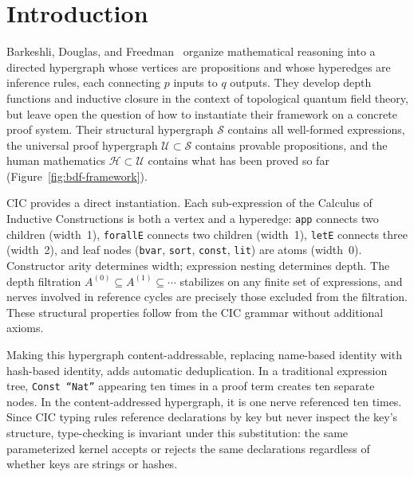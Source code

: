 \section{Introduction}\label{sec:introduction}

Barkeshli, Douglas, and Freedman~\cite{BDF2026} organize mathematical reasoning into a directed hypergraph whose vertices are propositions and whose hyperedges are inference rules, each connecting $p$ inputs to $q$ outputs.  They develop depth functions and inductive closure in the context of topological quantum field theory, but leave open the question of how to instantiate their framework on a concrete proof system.  Their structural hypergraph $\mathcal{S}$ contains all well-formed expressions, the universal proof hypergraph $\mathcal{U} \subset \mathcal{S}$ contains provable propositions, and the human mathematics $\mathcal{H} \subset \mathcal{U}$ contains what has been proved so far (Figure~\ref{fig:bdf-framework}).

CIC provides a direct instantiation.  Each sub-expression of the Calculus of Inductive Constructions is both a vertex and a hyperedge: \texttt{app} connects two children (width~1), \texttt{forallE} connects two children (width~1), \texttt{letE} connects three (width~2), and leaf nodes (\texttt{bvar}, \texttt{sort}, \texttt{const}, \texttt{lit}) are atoms (width~0).  Constructor arity determines width; expression nesting determines depth.  The depth filtration $A^{(0)} \subseteq A^{(1)} \subseteq \cdots$ stabilizes on any finite set of expressions, and nerves involved in reference cycles are precisely those excluded from the filtration.  These structural properties follow from the CIC grammar without additional axioms.

Making this hypergraph content-addressable, replacing name-based identity with hash-based identity, adds automatic deduplication.  In a traditional expression tree, \texttt{Const ``Nat''} appearing ten times in a proof term creates ten separate nodes.  In the content-addressed hypergraph, it is one nerve referenced ten times.  Since CIC typing rules reference declarations by key but never inspect the key's structure, type-checking is invariant under this substitution: the same parameterized kernel accepts or rejects the same declarations regardless of whether keys are strings or hashes.

